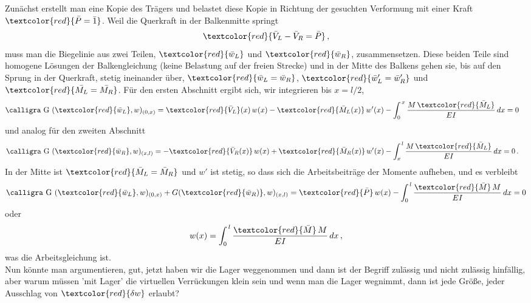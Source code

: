 Zun\"{a}chst erstellt man eine Kopie des Tr\"{a}gers und belastet diese Kopie in Richtung der gesuchten Verformung mit einer Kraft $\textcolor{red}{\bar{P} = \bar{1} }$. Weil die Querkraft in der Balkenmitte springt
\begin{align}
\textcolor{red}{\bar{V}_L - \bar{V}_R = \bar{P}}\,,
\end{align}
muss man die Biegelinie aus zwei Teilen, $\textcolor{red}{\bar{w}_L} $ und $\textcolor{red}{\bar{w}_R} $, zusammensetzen. Diese beiden Teile sind homogene L\"{o}sungen der Balkengleichung (keine Belastung auf der freien Strecke) und in der Mitte des Balkens gehen sie, bis auf den Sprung in der Querkraft, stetig ineinander \"{u}ber, $\textcolor{red}{\bar{w}_L = \bar{w}_R}$, $\textcolor{red}{\bar{w}_L' = \bar{w}_R'}$ und $\textcolor{red}{\bar{M_L} = \bar{M_R}}$. F\"{u}r den ersten Abschnitt ergibt sich, wir integrieren bis $x = l/2$,
\begin{align}
\text{\normalfont\calligra G\,\,}(\textcolor{red}{\bar{w}_L},w)_{(0,x)} &= \textcolor{red}{\bar{V}_L}(x)\,w(x) - \textcolor{red}{\bar{M}_L(x)}\,w'(x) - \int_0^{\,x} \frac{M\,\textcolor{red}{\bar{M}_L}}{EI}\,dx = 0
\end{align}
und analog f\"{u}r den zweiten Abschnitt
\begin{align}
\text{\normalfont\calligra G\,\,}(\textcolor{red}{\bar{w}_R},w)_{(x,l)} &= -\textcolor{red}{\bar{V}_R(x)}\,w(x) + \textcolor{red}{\bar{M}_R(x)}\,w'(x)  - \int_{x}^{\,l} \frac{M\,\textcolor{red}{\bar{M}_L}}{EI}\,dx = 0\,.
\end{align}
In der Mitte ist $\textcolor{red}{\bar{M}_L = \bar{M}_R}$ und $w'$ ist stetig, so dass sich die Arbeitsbeitr\"{a}ge der Momente aufheben, und es verbleibt
\begin{align}
\text{\normalfont\calligra G\,\,}(\textcolor{red}{\bar{w}_L},w)_{(0,x)} + G(\textcolor{red}{\bar{w}_R)},w)_{(x,l)} = \textcolor{red}{\bar{P}}\,w(x) - \int_0^{\,l} \frac{\textcolor{red}{\bar{M}}\,M}{EI}\,dx = 0
\end{align}
oder
\begin{align}
w(x) =  \int_0^{\,l} \frac{\textcolor{red}{\bar{M}}\,M}{EI}\,dx\,,
\end{align}
was die Arbeitsgleichung ist.\\

Nun k\"{o}nnte man argumentieren, gut, jetzt haben wir die Lager weggenommen und dann ist der Begriff zul\"{a}ssig und nicht zul\"{a}ssig hinf\"{a}llig, aber warum m\"{u}ssen 'mit Lager' die virtuellen Verr\"{u}ckungen klein sein und wenn man die Lager wegnimmt, dann ist jede Gr\"{o}{\ss}e, jeder Ausschlag von $\textcolor{red}{\delta w}$ erlaubt?

